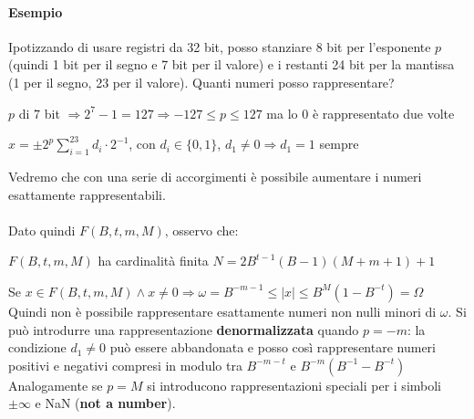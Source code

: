\documentclass[10pt]{book}
\begin{document}
\paragraph{Esempio} Ipotizzando di usare registri da 32 bit, posso stanziare 8 bit per l'esponente $p$ (quindi 1 bit per il segno e 7 bit per il valore) e i restanti 24 bit per la mantissa (1 per il segno, 23 per il valore). Quanti numeri posso rappresentare?
\begin{list}{}{}
	\item $p$ di 7 bit $\Rightarrow 2^7 - 1 = 127 \Rightarrow -127 \leq p \leq 127$ ma lo 0 è rappresentato due volte
	\item $x = \pm2^p \sum_{i=1}^23 d_i \cdot 2^{-1}$, con $d_i \in \{0, 1\}$, $d_1 \neq 0 \Rightarrow d_1 = 1$ sempre
\end{list}
Vedremo che con una serie di accorgimenti è possibile aumentare i numeri esattamente rappresentabili.\\\\
Dato quindi $F(B, t, m, M)$, osservo che:
\begin{list}{}{}
	\item $F(B, t, m, M)$ ha cardinalità finita $N = 2B^{t-1}(B - 1)(M + m + 1) + 1$
	\item Se $x \in F(B, t, m, M) \wedge x \neq 0 \Rightarrow \omega = B^{-m-1} \leq |x| \leq B^M(1 - B^{-t}) = \Omega$\\
	Quindi non è possibile rappresentare esattamente numeri non nulli minori di $\omega$. Si può introdurre una rappresentazione \textbf{denormalizzata} quando $p = -m$: la condizione $d_1 \neq 0$ può essere abbandonata e posso così rappresentare numeri positivi e negativi compresi in modulo tra $B^{-m-t}$ e $B^{-m}(B^{-1} - B^{-t})$\\
	Analogamente se $p = M$ si introducono rappresentazioni speciali per i simboli $\pm\infty$ e NaN (\textbf{not a number}).
\end{list}
\end{document}

